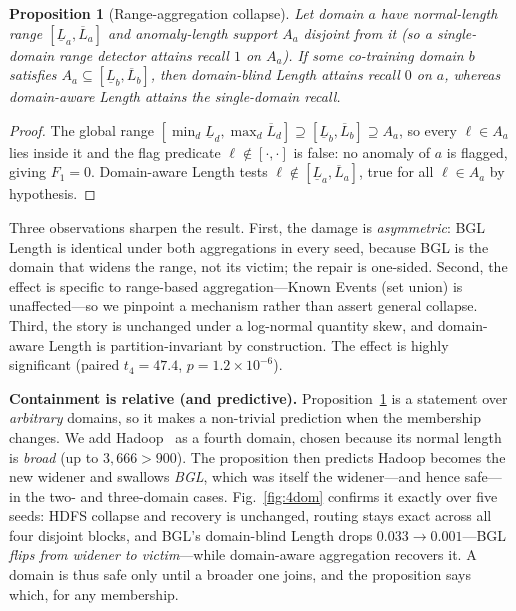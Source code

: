 \documentclass[conference]{IEEEtran}
\newtheorem{proposition}{Proposition}
\begin{document}
\begin{proposition}[Range-aggregation collapse]\label{prop}
Let domain $a$ have normal-length range $[\underline{L}_a,\overline{L}_a]$ and anomaly-length support
$A_a$ disjoint from it (so a single-domain range detector attains recall $1$ on $A_a$). If some
co-training domain $b$ satisfies $A_a\subseteq[\underline{L}_b,\overline{L}_b]$, then domain-blind
Length attains recall $0$ on $a$, whereas domain-aware Length attains the single-domain recall.
\end{proposition}
\begin{proof}
The global range $[\min_d\underline{L}_d,\max_d\overline{L}_d]\supseteq[\underline{L}_b,\overline{L}_b]
\supseteq A_a$, so every $\ell\in A_a$ lies inside it and the flag predicate $\ell\notin[\cdot,\cdot]$
is false: no anomaly of $a$ is flagged, giving $F_1=0$. Domain-aware Length tests
$\ell\notin[\underline{L}_a,\overline{L}_a]$, true for all $\ell\in A_a$ by hypothesis. \qedhere
\end{proof}

Three observations sharpen the result. First, the damage is \emph{asymmetric}: BGL Length is identical
under both aggregations in every seed, because BGL is the domain that widens the range, not its victim;
the repair is one-sided. Second, the effect is specific to range-based aggregation---Known Events (set
union) is unaffected---so we pinpoint a mechanism rather than assert general collapse. Third, the story
is unchanged under a log-normal quantity skew, and domain-aware Length is partition-invariant by
construction. The effect is highly significant (paired $t_4{=}47.4$, $p{=}1.2\times10^{-6}$).

\textbf{Containment is relative (and predictive).} Proposition~\ref{prop} is a statement over
\emph{arbitrary} domains, so it makes a non-trivial prediction when the membership changes. We add
Hadoop~\cite{zhu2023loghub} as a fourth domain, chosen because its normal length is \emph{broad} (up to
$3{,}666>900$). The proposition then predicts Hadoop becomes the new widener and swallows \emph{BGL},
which was itself the widener---and hence safe---in the two- and three-domain cases. Fig.~\ref{fig:4dom}
confirms it exactly over five seeds: HDFS collapse and recovery is unchanged, routing stays exact
across all four disjoint blocks, and BGL's domain-blind Length drops $0.033\!\rightarrow\!0.001$---BGL
\emph{flips from widener to victim}---while domain-aware aggregation recovers it. A domain is thus safe
only until a broader one joins, and the proposition says which, for any membership.
\end{document}
